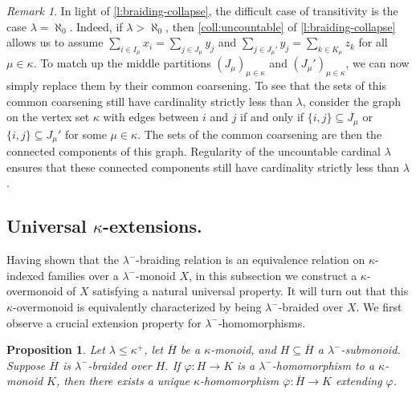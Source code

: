\documentclass[a4paper,11pt,oneside]{amsart}
\newtheorem{prop}[teor]{Proposition}
\theoremstyle{remark}
\newtheorem{remark}[teor]{Remark}
\begin{document}
\begin{remark}
  In light of \cref{l:braiding-collapse}, the difficult case of transitivity is the case $\lambda = \aleph_0$.
  Indeed, if $\lambda > \aleph_0$, then  \ref{coll:uncountable} of \cref{l:braiding-collapse} allows us to assume $\sum_{i \in I_\mu} x_i = \sum_{j \in J_\mu} y_j$ and $\sum_{j \in J_\mu'} y_j = \sum_{k \in K_\mu} z_k$ for all $\mu \in \kappa$.
  To match up the middle partitions $(J_\mu)_{\mu \in \kappa}$ and $(J_\mu')_{\mu \in \kappa}$, we can now simply replace them by their common coarsening.
  To see that the sets of this common coarsening still have cardinality strictly less than $\lambda$, consider the graph on the vertex set $\kappa$ with edges between $i$ and $j$ if and only if $\{i,j\} \subseteq J_\mu$ or $\{i,j\} \subseteq J_\mu'$ for some $\mu \in \kappa$.
  The sets of the common coarsening are then the connected components of this graph.
  Regularity of the uncountable cardinal $\lambda$ ensures that these connected components still have cardinality strictly less than $\lambda$.
\end{remark}

\subsection{Universal \texorpdfstring{$\kappa$}{κ}-extensions.}

Having shown that the $\lambda^-$-braiding relation is an equivalence relation on $\kappa$-indexed families over a $\lambda^-$-monoid $X$, in this subsection we construct a $\kappa$-overmonoid of $X$ satisfying a natural universal property.
It will turn out that this $\kappa$-overmonoid is equivalently characterized by being $\lambda^-$-braided over $X$.
We first observe a crucial extension property for $\lambda^-$-homomorphisms.

\begin{prop} \label{p:braiding-extend}
  Let $\lambda\le\kappa^+$, let $\overline{H}$ be a $\kappa$-monoid, and $H \subseteq \overline{H}$ a $\lambda^-$-submonoid.
  Suppose $\overline{H}$ is $\lambda^-$-braided over $H$.
  If $\varphi \colon H \to K$ is a $\lambda^-$-homomorphism to a $\kappa$-monoid $K$, then there exists a unique $\kappa$-homomorphism $\overline{\varphi}: \overline{H} \to K$ extending $\varphi$.
\end{prop}
\end{document}

